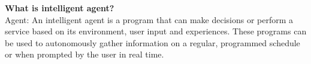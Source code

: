 \documentclass{article}
\begin{document}
	\textbf{What is intelligent agent?} \\
	Agent: 
	An intelligent agent is a program that can make decisions or perform a service based on its environment, user input and experiences. These programs can be used to autonomously gather information on a regular, programmed schedule or when prompted by the user in real time.
\end{document}
